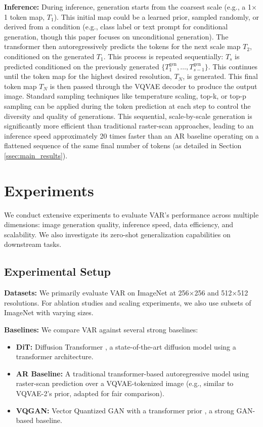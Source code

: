 \documentclass{article}
\begin{document}
\textbf{Inference:} During inference, generation starts from the coarsest scale (e.g., a 1$\times$1 token map, $T_1$). This initial map could be a learned prior, sampled randomly, or derived from a condition (e.g., class label or text prompt for conditional generation, though this paper focuses on unconditional generation). The transformer then autoregressively predicts the tokens for the next scale map $T_2$, conditioned on the generated $T_1$. This process is repeated sequentially: $T_s$ is predicted conditioned on the previously generated $\{T_1^{\text{gen}}, \ldots, T_{s-1}^{\text{gen}}\}$. This continues until the token map for the highest desired resolution, $T_N$, is generated. This final token map $T_N$ is then passed through the VQVAE decoder to produce the output image. Standard sampling techniques like temperature scaling, top-k, or top-p sampling can be applied during the token prediction at each step to control the diversity and quality of generations. This sequential, scale-by-scale generation is significantly more efficient than traditional raster-scan approaches, leading to an inference speed approximately 20 times faster than an AR baseline operating on a flattened sequence of the same final number of tokens (as detailed in Section \ref{ssec:main_results}).

\section{Experiments}
\label{sec:experiments}

We conduct extensive experiments to evaluate VAR's performance across multiple dimensions: image generation quality, inference speed, data efficiency, and scalability. We also investigate its zero-shot generalization capabilities on downstream tasks.

\subsection{Experimental Setup}
\label{ssec:setup}

\textbf{Datasets:} We primarily evaluate VAR on ImageNet \cite{deng2009imagenet} at 256$\times$256 and 512$\times$512 resolutions. For ablation studies and scaling experiments, we also use subsets of ImageNet with varying sizes.

\textbf{Baselines:} We compare VAR against several strong baselines:
\begin{itemize}[leftmargin=*,itemsep=2pt,topsep=3pt]
    \item \textbf{DiT:} Diffusion Transformer \cite{peebles2023scalable}, a state-of-the-art diffusion model using a transformer architecture.
    \item \textbf{AR Baseline:} A traditional transformer-based autoregressive model using raster-scan prediction over a VQVAE-tokenized image (e.g., similar to VQVAE-2's \cite{razavi2019generating} prior, adapted for fair comparison). %
    \item \textbf{VQGAN:} Vector Quantized GAN with a transformer prior \cite{esser2021taming}, a strong GAN-based baseline.
\end{itemize}
\end{document}
